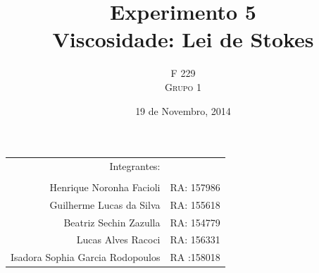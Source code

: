 \documentclass[english,brazil]{article}
\title{Experimento 5  \\ Viscosidade: Lei de Stokes } %
\author{F 229 \\ \textsc{Grupo 1}}
\date{19 de Novembro, 2014}
\providecommand{\tabularnewline}{\\}
\providecommand{\tabularnewline}{\\}
\begin{document}
\maketitle



\begin{center}
	\begin{tabular}{rr}
	                    Integrantes:  & \tabularnewline
	                                  & \tabularnewline
	        Henrique Noronha Facioli  & RA: 157986 \tabularnewline
	        Guilherme Lucas da Silva  & RA: 155618 \tabularnewline
	          Beatriz Sechin Zazulla  & RA: 154779 \tabularnewline
	              Lucas Alves Racoci  & RA: 156331 \tabularnewline
	Isadora Sophia Garcia Rodopoulos  & RA :158018 \tabularnewline
	\end{tabular}
\par\end{center}

\end{document}

